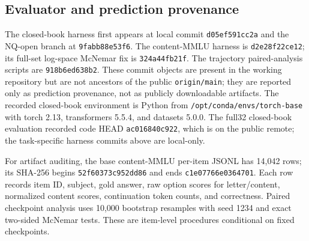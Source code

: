 \subsection{Evaluator and prediction provenance}
The closed-book harness first appears at local commit
\texttt{d05ef591cc2a} and the NQ-open branch at
\texttt{9fabb88e53f6}. The content-MMLU harness is
\texttt{d2e28f22ce12}; its full-set log-space McNemar fix is
\texttt{324a44fb21f}. The trajectory paired-analysis scripts are
\texttt{918b6ed638b2}. These commit objects are present in the working
repository but are not ancestors of the public \texttt{origin/main}; they are
reported only as prediction provenance, not as publicly downloadable artifacts.
The recorded closed-book environment is Python from
\texttt{/opt/conda/envs/torch-base} with torch 2.13, transformers 5.5.4, and
datasets 5.0.0. The full32 closed-book evaluation recorded code HEAD
\texttt{ac016840c922}, which is on the public remote; the task-specific harness
commits above are local-only.

For artifact auditing, the base content-MMLU per-item JSONL has 14,042 rows;
its SHA-256 begins \texttt{52f60373c952dd86} and ends
\texttt{c1e07766e0364701}. Each row records
item ID, subject, gold answer, raw option scores for letter/content, normalized
content scores, continuation token counts, and correctness. Paired checkpoint
analysis uses 10,000 bootstrap resamples with seed 1234 and exact two-sided
McNemar tests. These are item-level procedures conditional on fixed checkpoints.


